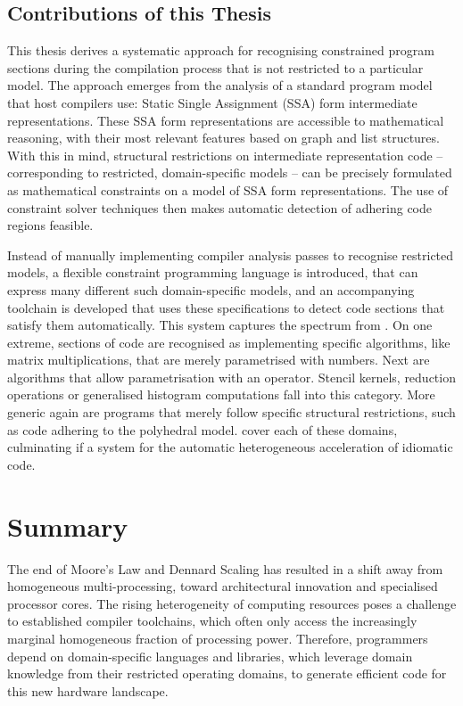 \subsection{Contributions of this Thesis}

    This thesis derives a systematic approach for recognising constrained
    program sections during the compilation process that is not restricted to a
    particular model.
    The approach emerges from the analysis of a standard program model that host
    compilers use: Static Single Assignment (SSA) form intermediate
    representations.
    These SSA form representations are accessible to mathematical reasoning,
    with their most relevant features based on graph and list structures.
    With this in mind, structural restrictions on intermediate representation
    code -- corresponding to restricted, domain-specific models -- can be
    precisely formulated as mathematical constraints on a model of SSA form
    representations.
    The use of constraint solver techniques then makes automatic detection of
    adhering code regions feasible.

    Instead of manually implementing compiler analysis passes to recognise
    restricted models, a flexible constraint programming language is introduced,
    that can express many different such domain-specific models, and an
    accompanying toolchain is developed that uses these specifications to
    detect code sections that satisfy them automatically.
    This system captures the spectrum from .
    On one extreme, sections of code are recognised as implementing
    specific algorithms, like matrix multiplications, that are merely
    parametrised with numbers.
    Next are algorithms that allow parametrisation with an operator.
    Stencil kernels, reduction operations or generalised histogram computations
    fall into this category.
    More generic again are programs that merely follow specific structural
    restrictions, such as code adhering to the polyhedral model.
     cover each of these
    domains, culminating if a system for the automatic heterogeneous
    acceleration of idiomatic code.

\section{Summary}

    The end of Moore's Law and Dennard Scaling has resulted in a shift away from
    homogeneous multi-processing, toward architectural innovation and
    specialised processor cores.
    The rising heterogeneity of computing resources poses a challenge to
    established compiler toolchains, which often only access the increasingly
    marginal homogeneous fraction of processing power.
    Therefore, programmers depend on domain-specific languages and libraries,
    which leverage domain knowledge from their restricted operating domains, to
    generate efficient code for this new hardware landscape.


